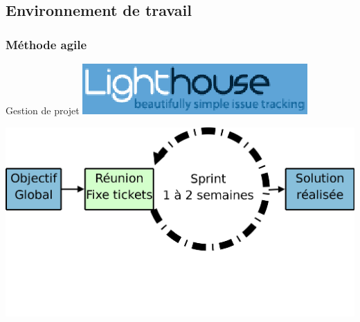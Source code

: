 \subsection{Environnement de travail}
\begin{frame}\frametitle{Méthode agile}
\centering
\begin{minipage}[c]{.5\linewidth}
	\begin{beamerboxesrounded}[shadow=true]{Gestion de projet}
		\includegraphics[width=\linewidth]{../image/lighthouseLogo.png}
	\end{beamerboxesrounded}
\end{minipage}
\vfill
\includegraphics[width=1\linewidth]{../image/agileDev.png}
\end{frame}
